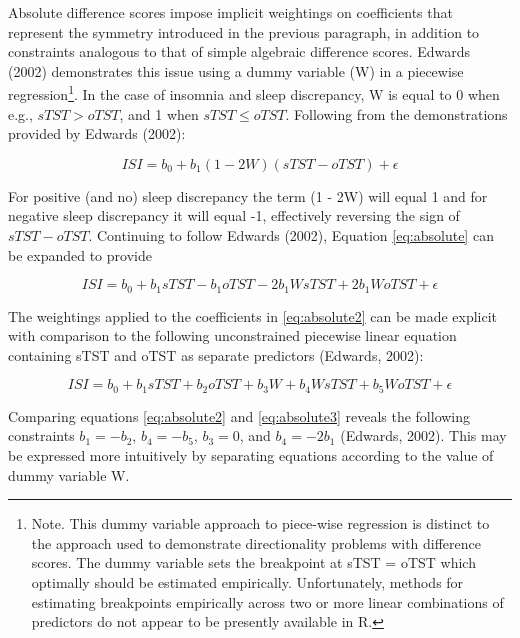 \documentclass[
]{article}
\begin{document}
Absolute difference scores impose implicit weightings on coefficients that represent the symmetry introduced in the previous paragraph, in addition to constraints analogous to that of simple algebraic difference scores. Edwards (2002) demonstrates this issue using a dummy variable (W) in a piecewise regression\footnote{Note. This dummy variable approach to piece-wise regression is distinct to the approach used to demonstrate directionality problems with difference scores. The dummy variable sets the breakpoint at sTST = oTST which optimally should be estimated empirically. Unfortunately, methods for estimating breakpoints empirically across two or more linear combinations of predictors do not appear to be presently available in R.}. In the case of insomnia and sleep discrepancy, W is equal to 0 when e.g., \(sTST > oTST\), and 1 when \(sTST \le oTST\). Following from the demonstrations provided by Edwards (2002):

\begin{equation}
ISI = b_{0} + b_{1} (1 - 2W)(sTST - oTST) + \epsilon
\label{eq:absolute}
\end{equation}

For positive (and no) sleep discrepancy the term (1 - 2W) will equal 1 and for negative sleep discrepancy it will equal -1, effectively reversing the sign of \(sTST - oTST\). Continuing to follow Edwards (2002), Equation \eqref{eq:absolute} can be expanded to provide

\begin{equation}
ISI = b_{0} + b_{1}sTST - b_{1}oTST - 2b_{1}W sTST + 2b_{1}W oTST + \epsilon
\label{eq:absolute2}
\end{equation}

The weightings applied to the coefficients in \eqref{eq:absolute2} can be made explicit with comparison to the following unconstrained piecewise linear equation containing sTST and oTST as separate predictors (Edwards, 2002):

\begin{equation}
ISI = b_{0} + b_{1}sTST + b_{2}oTST + b_{3}W + b_{4}W sTST + b_{5}W oTST + \epsilon
\label{eq:absolute3}
\end{equation}

Comparing equations \eqref{eq:absolute2} and \eqref{eq:absolute3} reveals the following constraints \(b_{1} = - b_{2}\), \(b_{4} = - b_{5}\), \(b_{3} = 0\), and \(b_{4} = -2b_{1}\) (Edwards, 2002). This may be expressed more intuitively by separating equations according to the value of dummy variable W.
\end{document}
